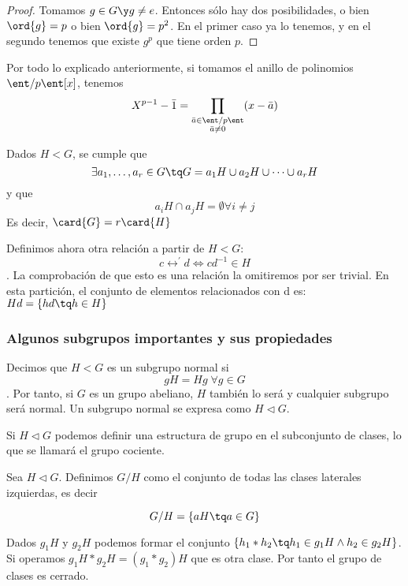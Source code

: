 \documentclass[nochap]{apuntes}
\begin{document}
  \begin{proof}
   Tomamos $g\in G \y g\neq e$. Entonces sólo hay dos posibilidades, o bien $\ord{g}=p$ o bien $\ord{g}=p^{2}$. En el primer caso ya lo tenemos, y en el segundo tenemos que existe $g^p$ que tiene orden $p$.
  \end{proof}

  \begin{example}
   Por todo lo explicado anteriormente, si tomamos el anillo de polinomios $\ent/p\ent[x]$, tenemos \[ X^{p-1}-\bar{1}=
   \prod_{\substack{\bar{a}\in\ent/p\ent \\ \bar{a}\neq 0}}(x-\bar{a}) \]
  \end{example}

  \begin{theorem}
   Dados $H<G$,  se cumple que \[ \exists a_{1},\dotsc,a_{r}\in G\tq G=a_{1}H \cup a_{2}H \cup \dotsb \cup a_{r}H\] y que \[ a_{i}H\cap a_{j}H=\emptyset \forall i\neq j\]
   Es decir, $\card{G}=r\card{H}$
  \end{theorem}

  Definimos ahora otra relación a partir de $H<G$: \[ c\rel^{'}d \Leftrightarrow cd^{-1}\in H \]. La comprobación de que esto es una relación
  la omitiremos por ser trivial. En esta partición, el conjunto de elementos relacionados con d es: $Hd=\{hd\tq h\in H\}$

\subsubsection{Algunos subgrupos importantes y sus propiedades}
  \begin{defn}
   Decimos que $H<G$  es un subgrupo normal si \[ gH=Hg \; \forall g \in G \]. Por tanto, si $G$ es un grupo abeliano, $H$ también lo será y cualquier  subgrupo será normal. Un subgrupo normal se expresa como $H\lhd G$.
  \end{defn}

  Si $H\lhd G$  podemos definir una estructura de grupo en el subconjunto de clases, lo que se llamará el grupo cociente.

  \begin{defn} Sea $H \lhd G$. Definimos $G / H$ como el conjunto de todas las clases laterales izquierdas, es decir

  \[ G/H = \{ aH \tq a \in G\} \]
  \end{defn}


  Dados $g_{1}H$  y $g_{2}H$  podemos formar el conjunto $\{h_{1}\ast h_{2}\tq h_{1}\in g_{1}H \wedge h_{2}\in g_{2}H\}$. Si operamos   $g_{1}H\ast g_{2}H=(g_{1}\ast g_{2})H$  que es otra clase. Por tanto el grupo de clases es cerrado.
\end{document}
